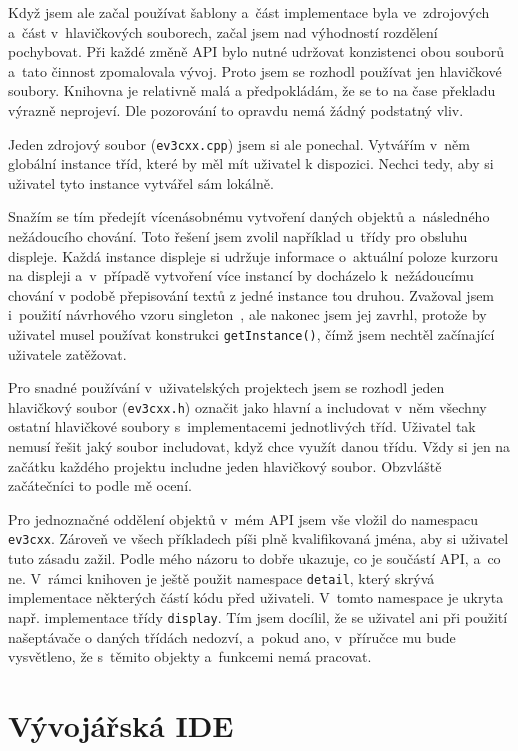 Když jsem ale začal používat šablony a~část implementace byla ve~zdrojových a~část v~hlavičkových souborech, začal jsem nad výhodností rozdělení pochybovat.
Při každé změně API bylo nutné udržovat konzistenci obou souborů a~tato činnost zpomalovala vývoj. 
Proto jsem se rozhodl používat jen hlavičkové soubory. Knihovna je relativně malá a předpokládám, že se to na čase překladu výrazně neprojeví.
Dle pozorování to opravdu nemá žádný podstatný vliv.

Jeden zdrojový soubor (\texttt{ev3cxx.cpp}) jsem si ale ponechal. 
Vytvářím v~něm globální instance tříd, které by měl mít uživatel  k dispozici. 
Nechci tedy, aby si uživatel tyto instance vytvářel sám lokálně.

Snažím se tím předejít vícenásobnému vytvoření daných objektů a~následného nežádoucího chování.
Toto řešení jsem zvolil například u~třídy pro obsluhu displeje. Každá instance displeje si udržuje informace o~aktuální poloze kurzoru na displeji a~v~případě vytvoření více instancí by docházelo k~nežádoucímu chování v podobě přepisování textů z jedné instance tou druhou.
Zvažoval jsem i~použití návrhového vzoru singleton~\cite{design-pattern-singleton}, ale nakonec jsem jej zavrhl, protože by uživatel musel používat konstrukci \texttt{getInstance()}, čímž jsem nechtěl začínající uživatele zatěžovat.

Pro snadné používání v~uživatelských projektech jsem se rozhodl jeden hlavičkový soubor (\texttt{ev3cxx.h}) označit jako hlavní a includovat v~něm všechny ostatní hlavičkové soubory s~implementacemi jednotlivých tříd.
Uživatel tak nemusí řešit jaký soubor includovat, když chce využít danou třídu.
Vždy si jen na začátku každého projektu includne jeden hlavičkový soubor.
Obzvláště začátečníci to podle mě ocení.

Pro jednoznačné oddělení objektů v~mém API jsem vše vložil do namespacu \texttt{ev3cxx}. 
Zároveň ve všech příkladech píši plně kvalifikovaná jména, aby si uživatel tuto zásadu zažil. 
Podle mého názoru to dobře ukazuje, co je součástí API, a~co ne.
V~rámci knihoven je ještě použit namespace \texttt{detail}, který skrývá implementace některých částí kódu před uživateli.
V~tomto namespace je ukryta např.  implementace třídy \texttt{display}. 
Tím jsem docílil, že se uživatel ani při použití našeptávače o daných třídách nedozví, a~pokud ano, v~příručce mu bude vysvětleno, že s~těmito objekty a~funkcemi nemá pracovat.



\section{Vývojářská IDE}

